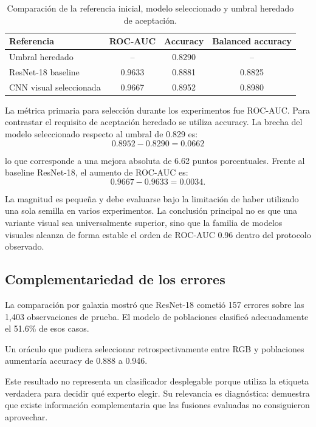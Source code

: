 \documentclass[letterpaper,11pt]{article}
\begin{document}
\begin{table}[H] 
  \centering 
  \caption{Comparación de la referencia inicial, modelo seleccionado y umbral heredado de aceptación.} 
  \label{tab:final}

  \begin{tabular}{lccc} 
    \toprule 
    Referencia & ROC-AUC & Accuracy & Balanced accuracy\\ 
    \midrule 
    Umbral heredado & -- & 0.8290 & --\\ 
    ResNet-18 baseline & 0.9633 & 0.8881 & 0.8825\\ 
    CNN visual seleccionada & 0.9667 & 0.8952 & 0.8980\\ 
    \bottomrule 
  \end{tabular}

\end{table}

La métrica primaria para selección durante los experimentos fue ROC-AUC. Para contrastar el requisito de aceptación heredado se utiliza accuracy. La brecha del modelo seleccionado respecto al umbral de 0.829 es: \[ 0.8952 - 0.8290 = 0.0662 \]

lo que corresponde a una mejora absoluta de 6.62 puntos porcentuales. Frente al baseline ResNet-18, el aumento de ROC-AUC es: \[ 0.9667 - 0.9633 = 0.0034. \]

La magnitud es pequeña y debe evaluarse bajo la limitación de haber utilizado una sola semilla en varios experimentos. La conclusión principal no es que una variante visual sea universalmente superior, sino que la familia de modelos visuales alcanza de forma estable el orden de ROC-AUC 0.96 dentro del protocolo observado. 

\subsection{Complementariedad de los errores} 

La comparación por galaxia mostró que ResNet-18 cometió 157 errores sobre las 1,403 observaciones de prueba. El modelo de poblaciones clasificó adecuadamente el 51.6\% de esos casos.

Un oráculo que pudiera seleccionar retrospectivamente entre RGB y poblaciones aumentaría accuracy de 0.888 a 0.946. 

Este resultado no representa un clasificador desplegable porque utiliza la etiqueta verdadera para decidir qué experto elegir. Su relevancia es diagnóstica: demuestra que existe información complementaria que las fusiones evaluadas no consiguieron aprovechar. 
\end{document}
